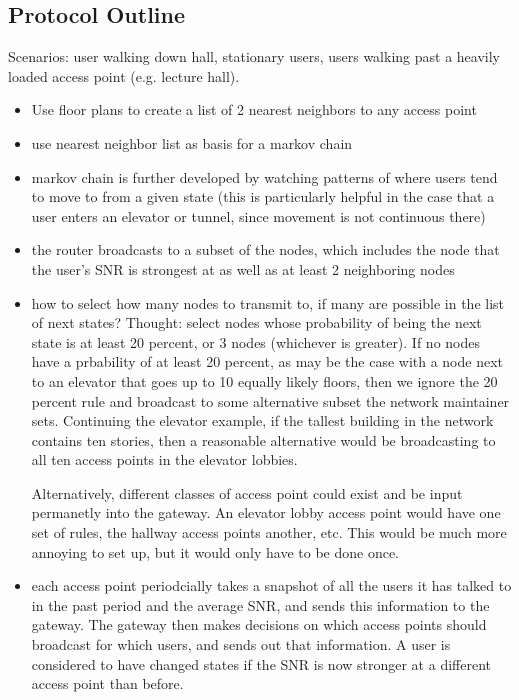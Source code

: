 \documentclass[letterpaper,12pt]{article}
\begin{document}
\subsection{Protocol Outline}

Scenarios: user walking down hall, stationary users, users walking past
a heavily loaded access point (e.g. lecture hall).

\begin{itemize}
\item Use floor plans to create a list of 2 nearest neighbors to any access point

\item use nearest neighbor list as basis for a markov chain

\item markov chain is further developed by watching patterns of where users tend 
to move to from a given state (this is particularly helpful in the case that a user
enters an elevator or tunnel, since movement is not continuous there)

\item the router broadcasts to a subset of the nodes, which includes the node 
that the user's SNR is strongest at as well as at least 2 neighboring nodes

\item how to select how many nodes to transmit to, if many are possible in the
list of next states? Thought: select nodes whose probability of being the next 
state is at least 20 percent, or 3 nodes (whichever is greater). If no nodes
have a prbability of at least 20 percent, as may be the case with a node next 
to an elevator that goes up to 10 equally likely floors, then we ignore the 20 
percent rule and broadcast to some alternative subset the network maintainer sets.
Continuing the elevator example, if the tallest building in the network contains
ten stories, then a reasonable alternative would be broadcasting to all ten
access points in the elevator lobbies.

Alternatively, different classes of access point could exist and be input
permanetly into the gateway. An elevator lobby access point would have one
set of rules, the hallway access points another, etc. This would be 
much more annoying to set up, but it would only have to be done once.

\item each access point periodcially takes a snapshot of all the users it has
talked to in the past period and the average SNR, and sends this information
to the gateway. The gateway then makes decisions on which access points
should broadcast for which users, and sends out that information.
A user is considered to  have changed states if the SNR is now stronger at a 
different access point than before. 


\end{itemize}
\end{document}
